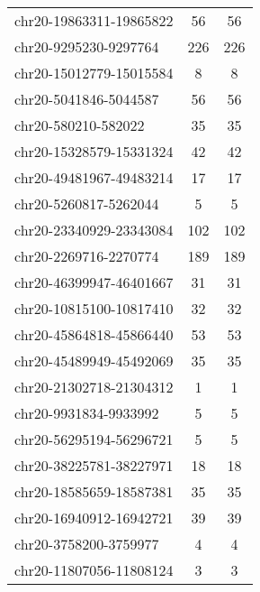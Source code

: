 \begin{longtable}{lSS}
	chr20-19863311-19865822 & 56     & 56                                        \\
	chr20-9295230-9297764   & 226    & 226                                       \\
	chr20-15012779-15015584 & 8      & 8                                         \\
	chr20-5041846-5044587   & 56     & 56                                        \\
	chr20-580210-582022     & 35     & 35                                        \\
	chr20-15328579-15331324 & 42     & 42                                        \\
	chr20-49481967-49483214 & 17     & 17                                        \\
	chr20-5260817-5262044   & 5      & 5                                         \\
	chr20-23340929-23343084 & 102    & 102                                       \\
	chr20-2269716-2270774   & 189    & 189                                       \\
	chr20-46399947-46401667 & 31     & 31                                        \\
	chr20-10815100-10817410 & 32     & 32                                        \\
	chr20-45864818-45866440 & 53     & 53                                        \\
	chr20-45489949-45492069 & 35     & 35                                        \\
	chr20-21302718-21304312 & 1      & 1                                         \\
	chr20-9931834-9933992   & 5      & 5                                         \\
	chr20-56295194-56296721 & 5      & 5                                         \\
	chr20-38225781-38227971 & 18     & 18                                        \\
	chr20-18585659-18587381 & 35     & 35                                        \\
	chr20-16940912-16942721 & 39     & 39                                        \\
	chr20-3758200-3759977   & 4      & 4                                         \\
	chr20-11807056-11808124 & 3      & 3                                         \\

\end{longtable}
